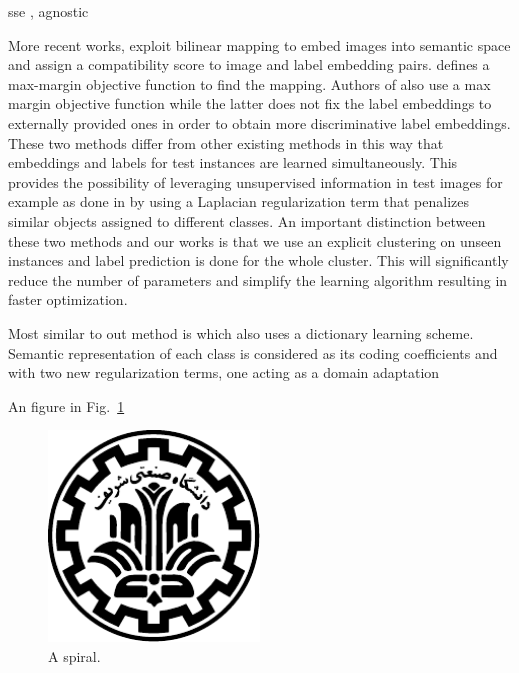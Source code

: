 \documentclass[wcp]{jmlr}
\begin{document}
sse , agnostic

More recent works, exploit bilinear mapping to embed images into semantic space and assign a compatibility score to image and label embedding pairs.
\cite{li15max} defines a max-margin objective function to find the mapping. Authors of \cite{max, semi15} also use a max margin objective function
while the latter does not fix the label embeddings to externally provided ones in order to obtain more discriminative label embeddings. These two methods
differ from other existing methods in this way that embeddings and labels for test instances are learned simultaneously. This provides the possibility of
leveraging unsupervised information in test images for example as done in \cite{semi15} by using a Laplacian regularization term that penalizes
 similar objects assigned to different classes.
 An important distinction between these two methods and our works is that we use an explicit clustering on unseen instances and label prediction is done
 for the whole cluster. This will significantly reduce the number of parameters and simplify the learning algorithm resulting in faster optimization.

 Most similar to out method is \cite{Kodirov2015} which also uses a dictionary learning scheme. Semantic representation of each class is considered as its
 coding coefficients and 
  with two new regularization terms, one acting as
 a domain adaptation

An figure in Fig.~\ref{fig:spiral}
\begin{figure}[htp]
\begin{center}
\includegraphics[width=0.5\textwidth]{../images/logo.pdf}
\caption{A spiral.}\label{fig:spiral}
\end{center}
\end{figure}
\end{document}
